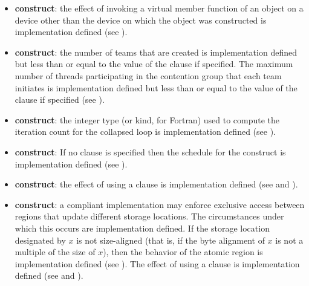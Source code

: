 \begin{itemize}
\item {} \textbf{construct}: the effect of invoking a virtual member
function of an object on a device other than the device on which the object was
constructed is implementation defined (see ).

\item {} \textbf{construct}: the number of teams that are created is implementation defined but 
less than or equal to the value of the  clause if specified. The maximum 
number of threads participating in the contention group that each team initiates is 
implementation defined but less than or equal to the value of the  
clause if specified (see ). 

\item {} \textbf{construct}: the integer type (or kind, for
    Fortran) used to compute the iteration count for the collapsed loop is
    implementation defined (see ). 

\item {} \textbf{construct}: If no  clause is specified then the schedule for the  
construct is implementation defined (see ). 

\item {} \textbf{construct}: the effect of using a 
clause is implementation defined (see  and ). 

\item {} \textbf{construct}: a compliant implementation may enforce exclusive access 
between  regions that update different storage locations. The circumstances 
under which this occurs are implementation defined. If the storage location 
designated by $x$ is not size-aligned (that is, if the byte alignment of $x$ is not a multiple 
of the size of $x$), then the behavior of the atomic region is implementation defined 
(see ).  
The effect of using a  clause is implementation defined (see  and ).

\end{itemize}
